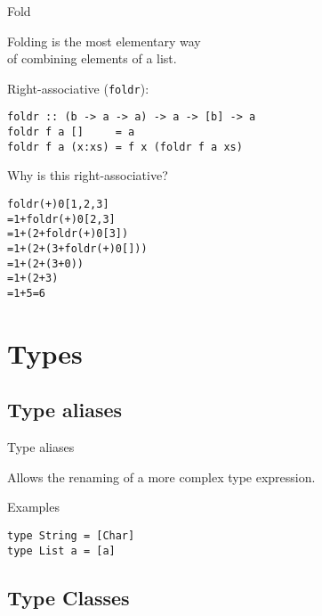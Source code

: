 \documentclass{beamer}
\def\code#1{\texttt{\frenchspacing#1}}
\begin{document}
\begin{frame}[fragile]{Fold}

\begin{block}{\centering Folding is the most elementary way \\ of combining elements of a list.}
\end{block}

Right-associative (\code{foldr}):

\begin{verbatim}
foldr :: (b -> a -> a) -> a -> [b] -> a
foldr f a []     = a
foldr f a (x:xs) = f x (foldr f a xs)
\end{verbatim}

\pause

Why is this right-associative?

\pause

\begin{alltt}
foldr (+) 0 [1,2,3]\pause
= 1 + foldr (+) 0 [2,3]\pause
= 1 + (2 + foldr (+) 0 [3])\pause
= 1 + (2 + (3 + foldr (+) 0 []))\pause
= 1 + (2 + (3 + 0))\pause
= 1 + (2 + 3)\pause
= 1 + 5 = 6
\end{alltt}

\end{frame}

\section{Types}

\subsection{Type aliases}

\begin{frame}[fragile]{Type aliases}

Allows the renaming of a more complex type expression.

\pause

\begin{exampleblock}{Examples}
\begin{verbatim}
type String = [Char]
type List a = [a]
\end{verbatim}
\end{exampleblock}

\end{frame}

\subsection{Type Classes}
\end{document}
